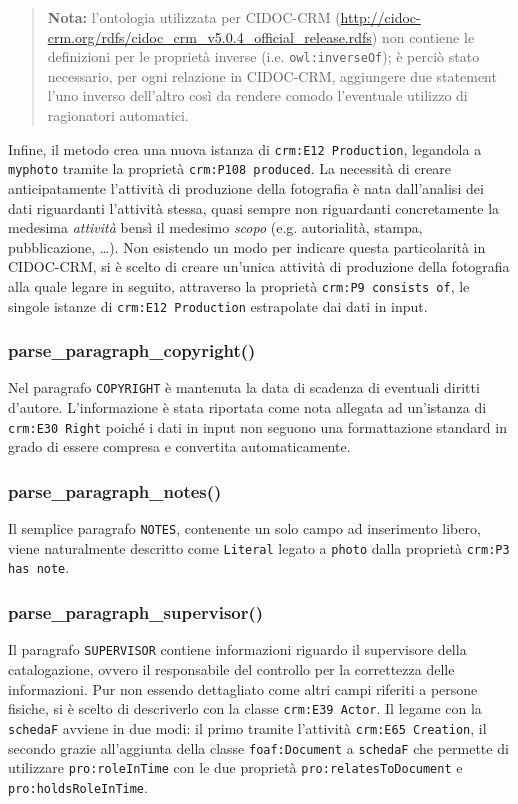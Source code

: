 \begin{quote}
\textbf{Nota:} l'ontologia utilizzata per CIDOC-CRM (\url{http://cidoc-crm.org/rdfs/cidoc_crm_v5.0.4_official_release.rdfs}) non contiene le definizioni per le proprietà inverse (i.e. \texttt{owl:inverseOf}); è perciò stato necessario, per ogni relazione in CIDOC-CRM, aggiungere due statement l'uno inverso dell'altro così da rendere comodo l'eventuale utilizzo di ragionatori automatici.
\end{quote}

Infine, il metodo crea una nuova istanza di \texttt{crm:E12 Production}, legandola a \texttt{myphoto} tramite la proprietà \texttt{crm:P108 produced}. La necessità di creare anticipatamente l'attività di produzione della fotografia è nata dall'analisi dei dati riguardanti l'attività stessa, quasi sempre non riguardanti concretamente la medesima \emph{attività} bensì il medesimo \emph{scopo} (e.g. autorialità, stampa, pubblicazione, \ldots). Non esistendo un modo per indicare questa particolarità in CIDOC-CRM, si è scelto di creare un'unica attività di produzione della fotografia alla quale legare in seguito, attraverso la proprietà \texttt{crm:P9 consists of}, le singole istanze di \texttt{crm:E12 Production} estrapolate dai dati in input.

\subsubsection{parse\_paragraph\_copyright()}
Nel paragrafo \texttt{COPYRIGHT} è mantenuta la data di scadenza di eventuali diritti d'autore. L'informazione è stata riportata come nota allegata ad un'istanza di \texttt{crm:E30 Right} poiché i dati in input non seguono una formattazione standard in grado di essere compresa e convertita automaticamente.

\subsubsection{parse\_paragraph\_notes()}
Il semplice paragrafo \texttt{NOTES}, contenente un solo campo ad inserimento libero, viene naturalmente descritto come \texttt{Literal} legato a \texttt{photo} dalla proprietà \texttt{crm:P3 has note}.

\subsubsection{parse\_paragraph\_supervisor()}
Il paragrafo \texttt{SUPERVISOR} contiene informazioni riguardo il supervisore della catalogazione, ovvero il responsabile del controllo per la correttezza delle informazioni. Pur non essendo dettagliato come altri campi riferiti a persone fisiche, si è scelto di descriverlo con la classe \texttt{crm:E39 Actor}. Il legame con la \texttt{schedaF} avviene in due modi: il primo tramite l'attività \texttt{crm:E65 Creation}, il secondo grazie all'aggiunta della classe \texttt{foaf:Document} a \texttt{schedaF} che permette di utilizzare \texttt{pro:roleInTime} con le due proprietà \texttt{pro:relatesToDocument} e \texttt{pro:holdsRoleInTime}.

